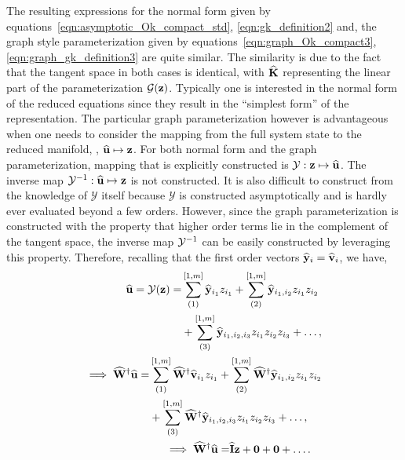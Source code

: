  The resulting expressions for the normal form given by equations~\eqref{eqn:asymptotic_Ok_compact_std},  \eqref{eqn:gk_definition2} and, the graph style parameterization given by equations~\eqref{eqn:graph_Ok_compact3}, \eqref{eqn:graph_gk_definition3} are quite similar. The similarity is due to the fact that the tangent space in both cases is identical, with $\mathbf{\widehat{K}}$ representing the linear part of the parameterization $\mathcal{G}(\mathbf{z})$. Typically one is interested in the normal form of the reduced equations since they result in the ``simplest form'' of the representation. The particular graph parameterization however is advantageous when one needs to consider the mapping from the full system state to the reduced manifold, \ie, $\widehat{\mathbf{u}} \mapsto \mathbf{z}$. For both normal form and the graph parameterization, mapping that is explicitly constructed is $\mathcal{Y}: \mathbf{z} \mapsto \widehat{\mathbf{u}}$. The inverse map $\mathrm{\mathcal{Y}^{-1}}: \widehat{\mathbf{u}} \mapsto \mathbf{z}$ is not constructed. It is also difficult to construct from the knowledge of $\mathcal{Y}$ itself  because $\mathcal{Y}$ is constructed asymptotically and is hardly ever evaluated beyond a few orders. However, since the graph parameterization is constructed with the property that higher order terms lie in the complement of the tangent space, the inverse map $\mathrm{\mathcal{Y}^{-1}}$ can be easily constructed by leveraging this property. Therefore, recalling that the first order vectors $\widehat{\mathbf{y}}_{i} = \widehat{\mathbf{v}}_{i}$, we have,
 \begin{align}
 		\begin{split}
 		\widehat{\mathbf{u}} = \mathcal{Y}(\mathbf{z}) =& \sum^{[1,m]}_{(1)}\widehat{\mathbf{y}}_{i_{1}}z_{i_{1}} + \sum^{[1,m]}_{(2)}\widehat{\mathbf{y}}_{i_{1},i_{2}}z_{i_{1}}z_{i_{2}} \\
 		& + \sum^{[1,m]}_{(3)}\widehat{\mathbf{y}}_{i_{1},i_{2},i_{3}}z_{i_{1}}z_{i_{2}}z_{i_{3}} + \ldots,
 	\end{split} \nonumber \\
 	\begin{split}
 		\implies\widehat{\mathbf{W}}^{\dagger}\widehat{\mathbf{u}} =& \sum^{[1,m]}_{(1)}\widehat{\mathbf{W}}^{\dagger}\widehat{\mathbf{v}}_{i_{1}}z_{i_{1}} + \sum^{[1,m]}_{(2)}\widehat{\mathbf{W}}^{\dagger}\widehat{\mathbf{y}}_{i_{1},i_{2}}z_{i_{1}}z_{i_{2}} \\
 		& + \sum^{[1,m]}_{(3)}\widehat{\mathbf{W}}^{\dagger}\widehat{\mathbf{y}}_{i_{1},i_{2},i_{3}}z_{i_{1}}z_{i_{2}}z_{i_{3}} + \ldots,
 	\end{split} \nonumber \\
 	\begin{split}
 		\implies\widehat{\mathbf{W}}^{\dagger}\widehat{\mathbf{u}} =& \mathbf{\widehat{I}}\mathbf{z} + \mathbf{0} + \mathbf{0} + \ldots .
 	\end{split} \nonumber
 \end{align}
